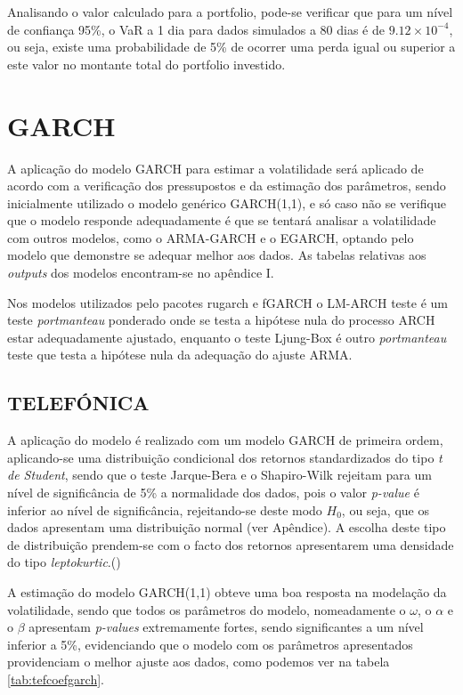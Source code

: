 \documentclass[
  12pt,
  a4paper,
  openany]{book}
\begin{document}
\normalsize

Analisando o valor calculado para a portfolio, pode-se verificar que para um nível de confiança 95\%, o VaR a 1 dia para dados simulados a 80 dias é de \ensuremath{9.12\times 10^{-4}}, ou seja, existe uma probabilidade de 5\% de ocorrer uma perda igual ou superior a este valor no montante total do portfolio investido.

\hypertarget{garch}{%
\section{GARCH}\label{garch}}

A aplicação do modelo GARCH para estimar a volatilidade será aplicado de acordo com a verificação dos pressupostos e da estimação dos parâmetros, sendo inicialmente utilizado o modelo genérico GARCH(1,1), e só caso não se verifique que o modelo responde adequadamente é que se tentará analisar a volatilidade com outros modelos, como o ARMA-GARCH e o EGARCH, optando pelo modelo que demonstre se adequar melhor aos dados. As tabelas relativas aos \emph{outputs} dos modelos encontram-se no apêndice I.

Nos modelos utilizados pelo pacotes rugarch e fGARCH o LM-ARCH teste é um teste \emph{portmanteau} ponderado onde se testa a hipótese nula do processo ARCH estar adequadamente ajustado, enquanto o teste Ljung-Box é outro \emph{portmanteau} teste que testa a hipótese nula da adequação do ajuste ARMA.

\hypertarget{telefuxf3nica}{%
\subsection{TELEFÓNICA}\label{telefuxf3nica}}

A aplicação do modelo é realizado com um modelo GARCH de primeira ordem, aplicando-se uma distribuição condicional dos retornos standardizados do tipo \emph{t de Student}, sendo que o teste Jarque-Bera e o Shapiro-Wilk rejeitam para um nível de significância de 5\% a normalidade dos dados, pois o valor \emph{p-value} é inferior ao nível de significância, rejeitando-se deste modo \(H_0\), ou seja, que os dados apresentam uma distribuição normal (ver Apêndice). A escolha deste tipo de distribuição prendem-se com o facto dos retornos apresentarem uma densidade do tipo \emph{leptokurtic}.(\citet{rvol})

A estimação do modelo GARCH(1,1) obteve uma boa resposta na modelação da volatilidade, sendo que todos os parâmetros do modelo, nomeadamente o \(\omega\), o \(\alpha\) e o \(\beta\) apresentam \emph{p-values} extremamente fortes, sendo significantes a um nível inferior a 5\%, evidenciando que o modelo com os parâmetros apresentados providenciam o melhor ajuste aos dados, como podemos ver na tabela \ref{tab:tefcoefgarch}.
\end{document}
